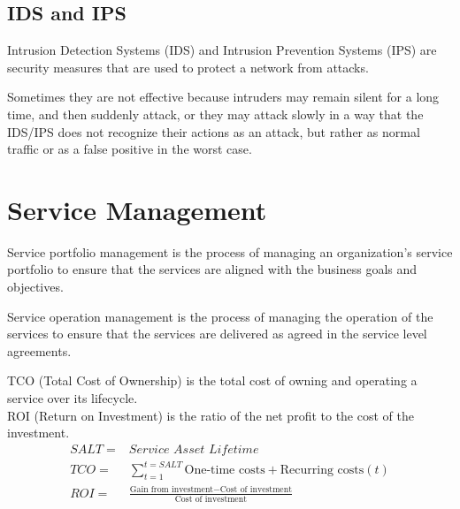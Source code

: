 \subsection{IDS and IPS}
Intrusion Detection Systems (IDS) and Intrusion Prevention Systems (IPS) are security measures that are used to protect a network from attacks.

Sometimes they are not effective because intruders may remain silent for a long time, and then suddenly attack, or they may attack slowly in a way that the IDS/IPS does not recognize their actions as an attack, but rather as normal traffic or as a false positive in the worst case.

\section{Service Management}
Service portfolio management is the process of managing an organization’s service portfolio to ensure that the services are aligned with the business goals and objectives.

Service operation management is the process of managing the operation of the services to ensure that the services are delivered as agreed in the service level agreements.

TCO (Total Cost of Ownership) is the total cost of owning and operating a service over its lifecycle.\\
ROI (Return on Investment) is the ratio of the net profit to the cost of the investment.
\begin{align}
   SALT =& \textit{Service Asset Lifetime}\\
   TCO =& \sum_{t=1}^{t = \textit{SALT}} \text{One-time costs} + \text{Recurring costs}(t)\\
   ROI =& \frac{\text{Gain from investment} - \text{Cost of investment}}{\text{Cost of investment}}
\end{align}
